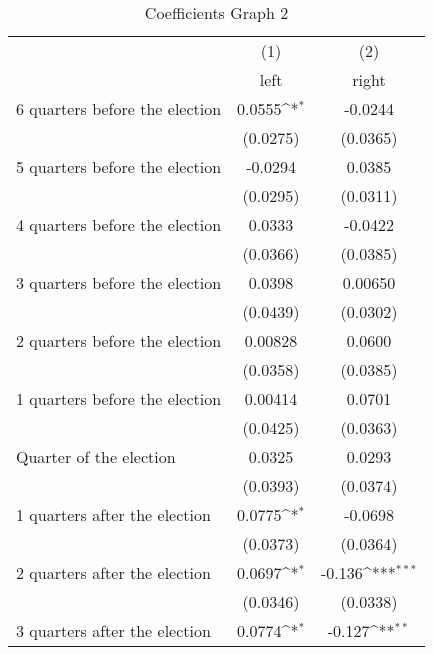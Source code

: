 \begin{table}[htbp]\centering
\def\sym#1{\ifmmode^{#1}\else\(^{#1}\)\fi}
\caption{Coefficients Graph 2}
\begin{tabular}{l*{2}{c}}
\hline\hline
                    &\multicolumn{1}{c}{(1)}&\multicolumn{1}{c}{(2)}\\
                    &\multicolumn{1}{c}{left}&\multicolumn{1}{c}{right}\\
\hline
 6 quarters before the election&      0.0555\sym{*}  &     -0.0244         \\
                    &    (0.0275)         &    (0.0365)         \\
[1em]
 5 quarters before the election&     -0.0294         &      0.0385         \\
                    &    (0.0295)         &    (0.0311)         \\
[1em]
 4 quarters before the election&      0.0333         &     -0.0422         \\
                    &    (0.0366)         &    (0.0385)         \\
[1em]
 3 quarters before the election&      0.0398         &     0.00650         \\
                    &    (0.0439)         &    (0.0302)         \\
[1em]
 2 quarters before the election&     0.00828         &      0.0600         \\
                    &    (0.0358)         &    (0.0385)         \\
[1em]
 1 quarters before the election&     0.00414         &      0.0701         \\
                    &    (0.0425)         &    (0.0363)         \\
[1em]
Quarter of the election&      0.0325         &      0.0293         \\
                    &    (0.0393)         &    (0.0374)         \\
[1em]
 1 quarters after the election&      0.0775\sym{*}  &     -0.0698         \\
                    &    (0.0373)         &    (0.0364)         \\
[1em]
 2 quarters after the election&      0.0697\sym{*}  &      -0.136\sym{***}\\
                    &    (0.0346)         &    (0.0338)         \\
[1em]
 3 quarters after the election&      0.0774\sym{*}  &      -0.127\sym{**} \\

\end{tabular}
\end{table}
